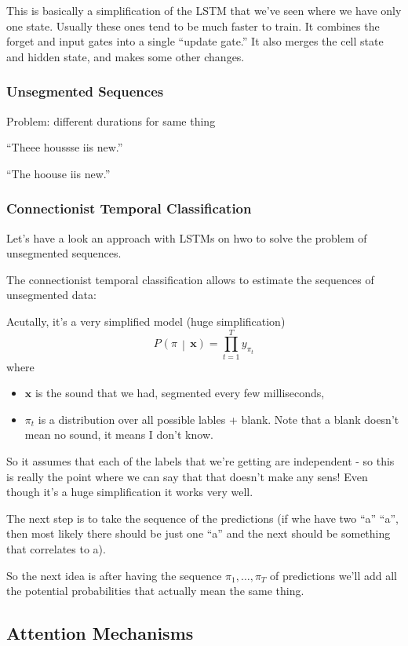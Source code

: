 \documentclass[a2paper,8pt]{extarticle}
\newcommand{\cProb}[3][]{P_{#1}\left( #2 \,\middle|\, #3 \right)}
\renewcommand{\vec}[1]{\mathbf{#1}}
\newcommand{\vx}{\vec{x}}
\begin{document}
\begin{landscape}
\begin{multicols*}{7}
This is basically a simplification of the LSTM that we've seen where we have
only one state. Usually these ones tend to be much faster to train. It combines
the forget and input gates into a single ``update gate.'' It also merges the
cell state and hidden state, and makes some other changes.

\subsubsection{Unsegmented Sequences}

Problem: different durations for same thing

``Theee houssse iis new.''

``The hoouse iis new.''


\subsubsection{Connectionist Temporal Classification}

Let's have a look an approach with LSTMs on hwo to solve the problem of
unsegmented sequences.

The connectionist temporal classification allows to estimate the sequences of
unsegmented data:

Acutally, it's a very simplified model (huge simplification)
\[
\cProb{\pi}{\vx}=\prod_{t=1}^T y_{\pi_t}
\]
where
\begin{itemize}
  \item $\vx$ is the sound that we had, segmented every few milliseconds,
  \item $\pi_t$ is a distribution over all possible lables + blank. Note that a
  blank doesn't mean no sound, it means I don't know.
\end{itemize} 
So it assumes that each of the labels that we're getting are independent - so
this is really the point where we can say that that doesn't make any sens! Even
though it's a huge simplification it works very well.

The next step is to take the sequence of the predictions (if whe have two ``a''
``a'', then most likely there should be just one ``a'' and the next should be
something that correlates to a).

So the next idea is after having the sequence $\pi_1,\ldots,\pi_T$ of
predictions we'll add all the potential probabilities that actually mean the
same thing.

\subsection{Attention Mechanisms}


\end{multicols*}
\end{landscape}
\end{document}
